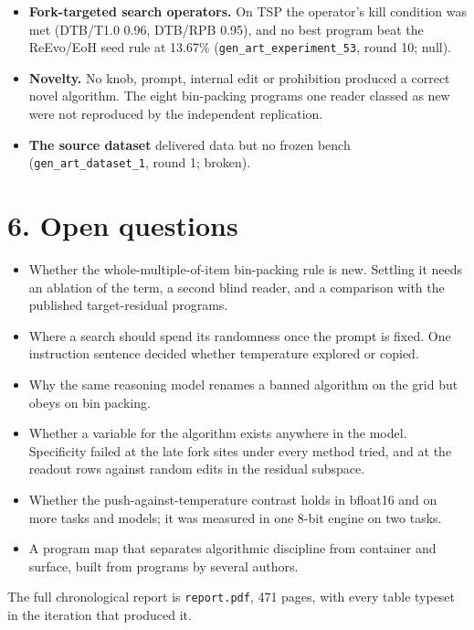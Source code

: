\documentclass[10pt]{article}
\begin{document}
\begin{itemize}
much of the effect, and Qwen3-8B's fork has no handle (\texttt{gen\_\allowbreak{}art\_\allowbreak{}experiment\_\allowbreak{}40}, round 8; null). Token walks stalled in
6 of 6 (\texttt{gen\_\allowbreak{}art\_\allowbreak{}experiment\_\allowbreak{}18}, round 3; null).
\item \textbf{Fork-targeted search operators.} On TSP the operator's kill condition was met (DTB/T1.0 0.96, DTB/RPB 0.95), and
no best program beat the ReEvo/EoH seed rule at 13.67\% (\texttt{gen\_\allowbreak{}art\_\allowbreak{}experiment\_\allowbreak{}53}, round 10; null).
\item \textbf{Novelty.} No knob, prompt, internal edit or prohibition produced a correct novel algorithm. The eight bin-packing
programs one reader classed as new were not reproduced by the independent replication.
\item \textbf{The source dataset} delivered data but no frozen bench (\texttt{gen\_\allowbreak{}art\_\allowbreak{}dataset\_\allowbreak{}1}, round 1; broken).
\end{itemize}

\section*{6. Open questions}

\begin{itemize}
\item Whether the whole-multiple-of-item bin-packing rule is new. Settling it needs an ablation of the term, a second blind
reader, and a comparison with the published target-residual programs.
\item Where a search should spend its randomness once the prompt is fixed. One instruction sentence decided whether
temperature explored or copied.
\item Why the same reasoning model renames a banned algorithm on the grid but obeys on bin packing.
\item Whether a variable for the algorithm exists anywhere in the model. Specificity failed at the late fork sites under every
method tried, and at the readout rows against random edits in the residual subspace.
\item Whether the push-against-temperature contrast holds in bfloat16 and on more tasks and models; it was measured in one 8-bit engine on two
tasks.
\item A program map that separates algorithmic discipline from container and surface, built from programs by several authors.
\end{itemize}
The full chronological report is \texttt{report.pdf}, 471 pages, with every table typeset in the iteration that
produced it.
\end{document}
